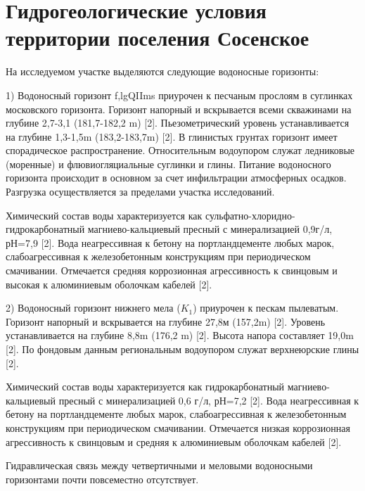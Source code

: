 \chapter*{Гидрогеологические условия территории поселения Сосенское} 

На исследуемом участке выделяются следующие водоносные горизонты:

1) Водоносный горизонт f,lgQIIms приурочен к песчаным прослоям в суглинках московского горизонта. 
Горизонт напорный и вскрывается всеми скважинами на глубине 2,7-3,1 (181,7-182,2 \si{\meter}) [2]. 
Пьезометрический уровень устанавливается на глубине 1,3-1,5\si{\meter} (183,2-183,7\si{\meter}) [2]. 
В глинистых грунтах горизонт имеет спорадическое распространение. Относительным водоупором служат ледниковые (моренные) 
и флювиогляциальные суглинки и глины. Питание водоносного горизонта происходит в основном за счет инфильтрации атмосферных осадков. 
Разгрузка осуществляется за пределами участка исследований.

Химический состав воды характеризуется как сульфатно-хлоридно-гидрокарбонатный магниево-кальциевый пресный 
с минерализацией 0,9г/л, рН=7,9 [2]. Вода неагрессивная к бетону на портландцементе любых марок, слабоагрессивная 
к железобетонным конструкциям при периодическом смачивании. Отмечается средняя коррозионная агрессивность 
к свинцовым и высокая к алюминиевым оболочкам кабелей [2].

2) Водоносный горизонт нижнего мела ($K_1$) приурочен к пескам пылеватым. Горизонт напорный и вскрывается 
на глубине 27,8м (157,2\si{\meter}) [2]. Уровень устанавливается на глубине 8,8\si{\meter} (176,2 \si{\meter}) [2]. Высота напора составляет 19,0\si{\meter} [2]. 
По фондовым данным региональным водоупором служат верхнеюрские глины [2].

Химический состав воды характеризуется как гидрокарбонатный магниево-кальциевый пресный с минерализацией 0,6 г/л, 
рН=7,2 [2]. Вода неагрессивная к бетону на портландцементе любых марок, слабоагрессивная к железобетонным конструкциям 
при периодическом смачивании. Отмечается низкая коррозионная агрессивность к свинцовым и средняя к алюминиевым оболочкам кабелей [2].

Гидравлическая связь между четвертичными и меловыми водоносными горизонтами почти повсеместно отсутствует.